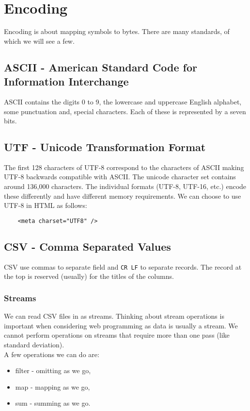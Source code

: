 \section{Encoding}

Encoding is about mapping symbols to bytes. There are many
standards, of which we will see a few.

\subsection{ASCII - American Standard Code for Information 
\newline Interchange}

ASCII contains the digits 0 to 9, the lowercase and uppercase
English alphabet, some punctuation and, special characters.
Each of these is represented by a seven bits.

\subsection{UTF - Unicode Transformation Format}

The first 128 characters of UTF-8 correspond to the
characters of ASCII making UTF-8 backwards compatible 
with ASCII. The unicode character set contains around 
136,000 characters. The individual formats (UTF-8, UTF-16, etc.) 
encode these differently and have different memory
requirements. We can choose to use UTF-8 in HTML as follows:
\begin{lstlisting}
    <meta charset="UTF8" />
\end{lstlisting}

\subsection{CSV - Comma Separated Values}

CSV use commas to separate field and \texttt{CR LF} to
separate records. The record at the top is reserved (usually)
for the titles of the columns.

\subsubsection{Streams}

We can read CSV files in as streams. Thinking about stream
operations is important when considering web programming as data
is usually a stream. We cannot perform operations on streams
that require more than one pass (like standard deviation).
\\[\baselineskip]
A few operations we can do are: \begin{itemize}
    \item filter - omitting as we go,
    \item map - mapping as we go,
    \item sum - summing as we go. 
\end{itemize}